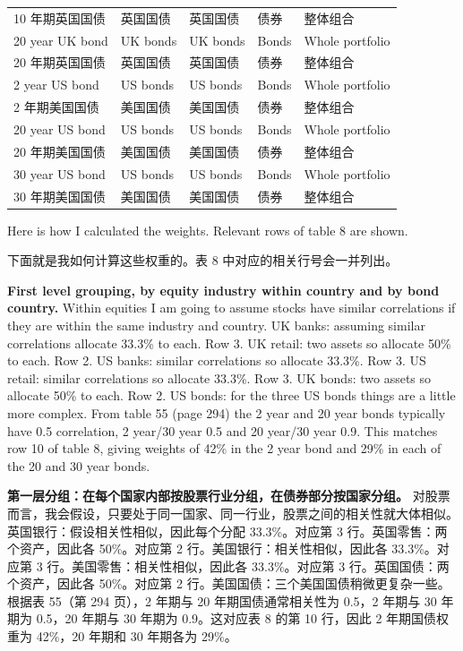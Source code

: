 \begin{bilingualtableblock}
{\begin{tabular}{@{} lllll@{}}
10 年期英国国债 & 英国国债 & 英国国债 & 债券 & 整体组合 \\
20 year UK bond & UK bonds & UK bonds & Bonds & Whole portfolio \\
20 年期英国国债 & 英国国债 & 英国国债 & 债券 & 整体组合 \\
2 year US bond & US bonds & US bonds & Bonds & Whole portfolio \\
2 年期美国国债 & 美国国债 & 美国国债 & 债券 & 整体组合 \\
20 year US bond & US bonds & US bonds & Bonds & Whole portfolio \\
20 年期美国国债 & 美国国债 & 美国国债 & 债券 & 整体组合 \\
30 year US bond & US bonds & US bonds & Bonds & Whole portfolio \\
30 年期美国国债 & 美国国债 & 美国国债 & 债券 & 整体组合 \\
\bottomrule
\end{tabular}%
}
\par \end{bilingualtableblock}

\begin{englishblock} Here is how I calculated the weights. Relevant rows of table 8 are shown. \end{englishblock}

\medskip

\begin{chineseblock}下面就是我如何计算这些权重的。表 8 中对应的相关行号会一并列出。\end{chineseblock}

\medskip \noindent\textbf{First level grouping, by equity industry within country and by bond country.} Within equities I am going to assume stocks have similar correlations if they are within the same industry and country. UK banks: assuming similar correlations allocate 33.3\% to each. Row 3. UK retail: two assets so allocate 50\% to each. Row 2. US banks: similar correlations so allocate 33.3\%. Row 3. US retail: similar correlations so allocate 33.3\%. Row 3. UK bonds: two assets so allocate 50\% to each. Row 2. US bonds: for the three US bonds things are a little more complex. From table 55 (page 294) the 2 year and 20 year bonds typically have 0.5 correlation, 2 year/30 year 0.5 and 20 year/30 year 0.9. This matches row 10 of table 8, giving weights of 42\% in the 2 year bond and 29\% in each of the 20 and 30 year bonds.

\medskip \noindent\textbf{第一层分组：在每个国家内部按股票行业分组，在债券部分按国家分组。} 对股票而言，我会假设，只要处于同一国家、同一行业，股票之间的相关性就大体相似。英国银行：假设相关性相似，因此每个分配 33.3\%。对应第 3 行。英国零售：两个资产，因此各 50\%。对应第 2 行。美国银行：相关性相似，因此各 33.3\%。对应第 3 行。美国零售：相关性相似，因此各 33.3\%。对应第 3 行。英国国债：两个资产，因此各 50\%。对应第 2 行。美国国债：三个美国国债稍微更复杂一些。根据表 55（第 294 页），2 年期与 20 年期国债通常相关性为 0.5，2 年期与 30 年期为 0.5，20 年期与 30 年期为 0.9。这对应表 8 的第 10 行，因此 2 年期国债权重为 42\%，20 年期和 30 年期各为 29\%。

